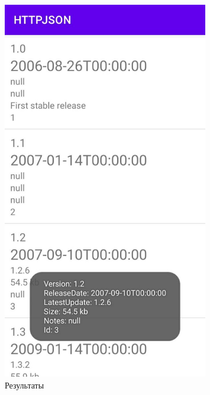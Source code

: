 \documentclass[a4paper, 14pt]{extarticle}
\begin{document}
\begin{figure}[!htb]
	\centering
	\includegraphics[width=0.8\textwidth]{img2}
\caption{Результаты}
\label{fig:img2}
\end{figure}
\end{document}
